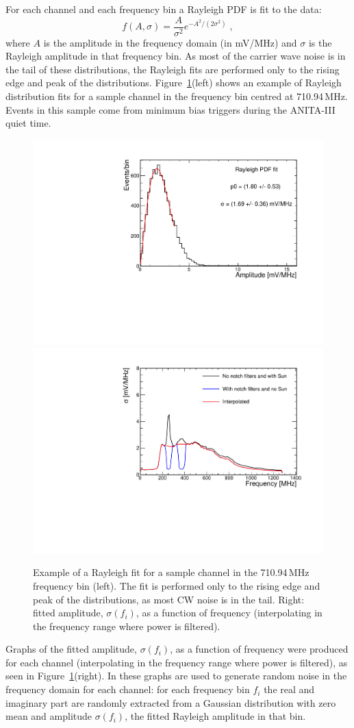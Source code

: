 For each channel and each frequency bin a Rayleigh PDF is fit to the data:
\begin{equation} 
  f(A, \sigma)=\dfrac{A}{\sigma^2}e^{-A^2/(2\sigma^2)} \;,
  \label{eq:rayleigh}
\end{equation}
\noindent where $A$ is the amplitude in the frequency domain (in mV/MHz) and $\sigma$ is the
Rayleigh amplitude in that frequency bin.
As most of the carrier wave noise is in the tail of these
distributions, the Rayleigh fits are performed only to the rising edge and peak of the distributions.
Figure~\ref{fig:rayleighFits}(left) shows an example of Rayleigh distribution fits for a sample channel in the frequency bin centred at 710.94\,MHz.
Events in this sample come from minimum bias triggers during the ANITA-III quiet time.
 
\begin{figure}[!h]\centering
  \includegraphics[width=.45\linewidth]{./Figs/RayleighExample.pdf}
  \includegraphics[width=.45\linewidth]{./Figs/RayleighSigma_1V_old.pdf}
  \caption{Example of a Rayleigh fit for a sample channel in the
    710.94\,MHz frequency bin (left). The fit is performed only to the rising edge and peak of the distributions, as most CW noise is in the tail. 
Right: fitted amplitude, $\sigma(f_i)$, as a
    function of frequency (interpolating in the frequency range where power is filtered). }
  \label{fig:rayleighFits}
\end{figure}

Graphs of the fitted amplitude, $\sigma(f_i)$, as a function of
frequency were produced for each channel (interpolating in the frequency range where power is filtered), as seen in Figure~\ref{fig:rayleighFits}(right).
In \icemc these graphs are used to generate random noise in the
frequency domain for each channel: for each frequency bin $f_i$ the real and imaginary part are randomly extracted from a Gaussian distribution with zero mean and amplitude
$\sigma(f_i)$, the fitted Rayleigh amplitude in that bin.

